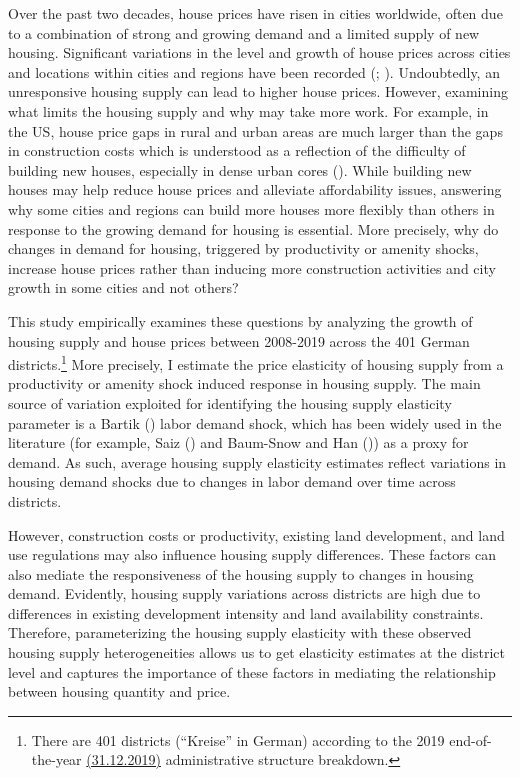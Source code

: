 \documentclass[
  12pt,
]{article}
\begin{document}
Over the past two decades, house prices have risen in cities worldwide, often due to a combination of strong and growing demand and a limited supply of new housing. Significant variations in the level and growth of house prices across cities and locations within cities and regions have been recorded (; ). Undoubtedly, an unresponsive housing supply can lead to higher house prices. However, examining what limits the housing supply and why may take more work. For example, in the US, house price gaps in rural and urban areas are much larger than the gaps in construction costs which is understood as a reflection of the difficulty of building new houses, especially in dense urban cores (). While building new houses may help reduce house prices and alleviate affordability issues, answering why some cities and regions can build more houses more flexibly than others in response to the growing demand for housing is essential. More precisely, why do changes in demand for housing, triggered by productivity or amenity shocks, increase house prices rather than inducing more construction activities and city growth in some cities and not others?

This study empirically examines these questions by analyzing the growth of housing supply and house prices between 2008-2019 across the 401 German districts.\footnote{There are 401 districts (``Kreise'' in German) according to the 2019 end-of-the-year \href{https://www.destatis.de/DE/Themen/Laender-Regionen/Regionales/Gemeindeverzeichnis/Administrativ/Archiv/Verwaltungsgliederung/31122019_Jahr.html}{(31.12.2019)} administrative structure breakdown.} More precisely, I estimate the price elasticity of housing supply from a productivity or amenity shock induced response in housing supply. The main source of variation exploited for identifying the housing supply elasticity parameter is a Bartik () labor demand shock, which has been widely used in the literature (for example, Saiz () and Baum-Snow and Han ()) as a proxy for demand. As such, average housing supply elasticity estimates reflect variations in housing demand shocks due to changes in labor demand over time across districts.

However, construction costs or productivity, existing land development, and land use regulations may also influence housing supply differences. These factors can also mediate the responsiveness of the housing supply to changes in housing demand. Evidently, housing supply variations across districts are high due to differences in existing development intensity and land availability constraints. Therefore, parameterizing the housing supply elasticity with these observed housing supply heterogeneities allows us to get elasticity estimates at the district level and captures the importance of these factors in mediating the relationship between housing quantity and price.
\end{document}

